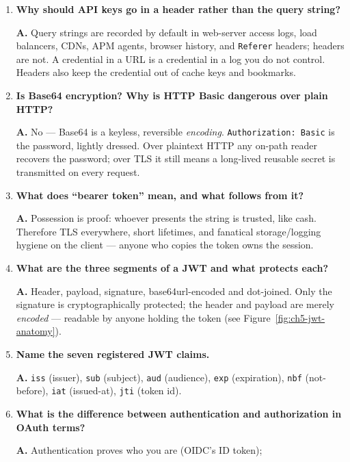 \begin{enumerate}[label=\textbf{Q\arabic*.}, leftmargin=1.7cm, itemsep=0.9em]
  \item \textbf{Why should API keys go in a header rather than the query
        string?}\par
        \textbf{A.} Query strings are recorded by default in web-server
        access logs, load balancers, CDNs, APM agents, browser history, and
        \texttt{Referer} headers; headers are not. A credential in a URL is
        a credential in a log you do not control. Headers also keep the
        credential out of cache keys and bookmarks.
  \item \textbf{Is Base64 encryption? Why is HTTP Basic dangerous over plain
        HTTP?}\par
        \textbf{A.} No --- Base64 is a keyless, reversible \emph{encoding}.
        \texttt{Authorization: Basic} is the password, lightly dressed. Over
        plaintext HTTP any on-path reader recovers the password; over TLS it
        still means a long-lived reusable secret is transmitted on every
        request.
  \item \textbf{What does ``bearer token'' mean, and what follows from
        it?}\par
        \textbf{A.} Possession is proof: whoever presents the string is
        trusted, like cash. Therefore TLS everywhere, short lifetimes, and
        fanatical storage/logging hygiene on the client --- anyone who
        copies the token owns the session.
  \item \textbf{What are the three segments of a JWT and what protects
        each?}\par
        \textbf{A.} Header, payload, signature, base64url-encoded and
        dot-joined. Only the signature is cryptographically protected; the
        header and payload are merely \emph{encoded} --- readable by anyone
        holding the token (see Figure~\ref{fig:ch5-jwt-anatomy}).
  \item \textbf{Name the seven registered JWT claims.}\par
        \textbf{A.} \texttt{iss} (issuer), \texttt{sub} (subject),
        \texttt{aud} (audience), \texttt{exp} (expiration), \texttt{nbf}
        (not-before), \texttt{iat} (issued-at), \texttt{jti} (token id).
  \item \textbf{What is the difference between authentication and
        authorization in OAuth terms?}\par
        \textbf{A.} Authentication proves who you are (OIDC's ID token);

\end{enumerate}

